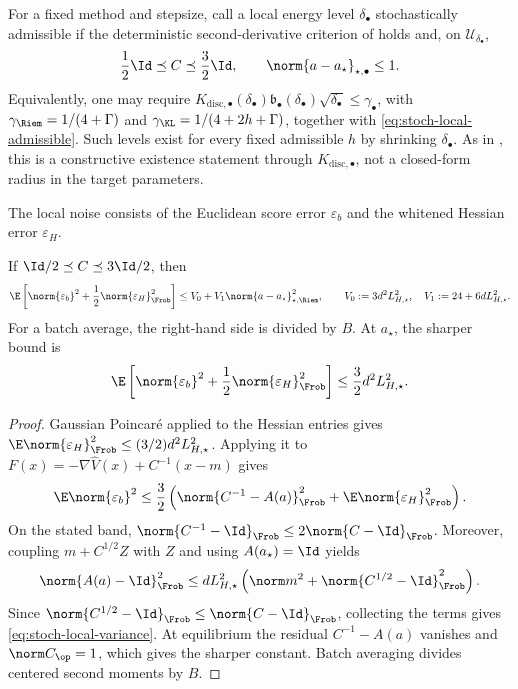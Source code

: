 For a fixed method and stepsize, call a local energy level
\(\delta_\bullet\) stochastically admissible if the deterministic
second-derivative criterion of  holds and, on
\(\mathcal U_{\delta_\bullet}\),
\begin{equation}
  \frac12\Id\preceq C\preceq\frac32\Id,
  \qquad
  \norm{a-a_\star}_{\star,\bullet}\leq1.
  \label{eq:stoch-local-admissible}
\end{equation}
Equivalently, one may require
\(K_{\mathrm{disc},\bullet}(\delta_\bullet)
\mathfrak b_\bullet(\delta_\bullet)\sqrt{\delta_\bullet}
\leq\gamma_\bullet\), with
\(\gamma_{\Riem}=1/(4+\Gamma)\) and
\(\gamma_{\KL}=1/(4+2h+\Gamma)\), together with
\eqref{eq:stoch-local-admissible}.  Such levels exist for every fixed
admissible \(h\) by shrinking \(\delta_\bullet\).  As in
, this is a constructive existence
statement through \(K_{\mathrm{disc},\bullet}\), not a closed-form radius in the target
parameters.

The local noise consists of the Euclidean score error
\(\varepsilon_b\) and the whitened Hessian error \(\varepsilon_H\).

\begin{lemma}
\label{lem:stoch-local-variance}
If \(\Id/2\preceq C\preceq3\Id/2\), then
\begin{equation}
  \E\left[\norm{\varepsilon_b}^2
    +\frac12\norm{\varepsilon_H}_{\Frob}^2\right]
  \leq V_0+V_1\norm{a-a_\star}_{\star,\Riem}^2,
  \qquad
  V_0:=3d^2L_{H,\star}^2,
  \quad
  V_1:=24+6dL_{H,\star}^2.
  \label{eq:stoch-local-variance}
\end{equation}
For a batch average, the right-hand side is divided by \(B\).  At
\(a_\star\), the sharper bound is
\[
  \E\left[\norm{\varepsilon_b}^2
    +\frac12\norm{\varepsilon_H}_{\Frob}^2\right]
  \leq\frac32d^2L_{H,\star}^2.
\]
\end{lemma}

\begin{proof}
Gaussian Poincar\'e applied to the Hessian entries gives
\(\E\norm{\varepsilon_H}_{\Frob}^2\leq(3/2)d^2L_{H,\star}^2\).
Applying it to
\(F(x)=-\nabla\widehat V(x)+C^{-1}(x-m)\) gives
\[
  \E\norm{\varepsilon_b}^2
  \leq\frac32\left(
    \norm{C^{-1}-A(a)}_{\Frob}^2
    +\E\norm{\varepsilon_H}_{\Frob}^2
  \right).
\]
On the stated band,
\(\norm{C^{-1}-\Id}_{\Frob}\leq2\norm{C-\Id}_{\Frob}\).
Moreover, coupling \(m+C^{1/2}Z\) with \(Z\) and using
\(A(a_\star)=\Id\) yields
\[
  \norm{A(a)-\Id}_{\Frob}^2
  \leq dL_{H,\star}^2
  \left(\norm m^2+\norm{C^{1/2}-\Id}_{\Frob}^2\right).
\]
Since
\(\norm{C^{1/2}-\Id}_{\Frob}\leq\norm{C-\Id}_{\Frob}\), collecting the
terms gives \eqref{eq:stoch-local-variance}.  At equilibrium the residual
\(C^{-1}-A(a)\) vanishes and \(\norm C_{\op}=1\), which gives the sharper
constant.  Batch averaging divides centered second moments by \(B\).
\end{proof}


